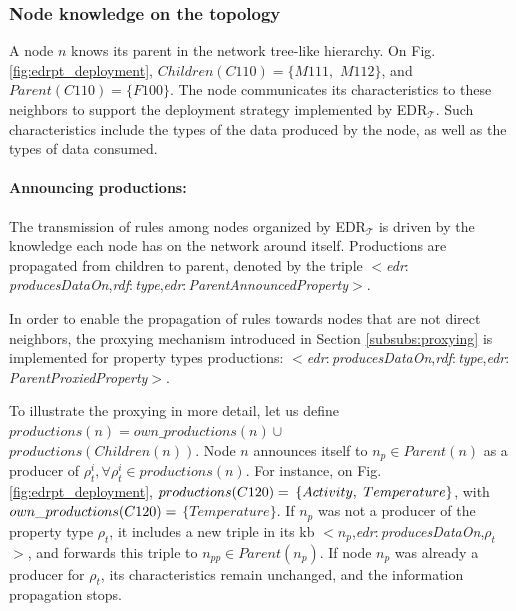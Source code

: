 \documentclass[sw]{iosart2x}
\newcommand{\edrt}{EDR$_{\mathcal{T}}$\xspace}
\newcommand{\namespace}[1]{\textit{#1$:$}}
\newcommand{\concept}[2]{\namespace{#1}\-\textit{#2}}
\newcommand{\triplet}[3]{$<$#1,\textit{#2},#3$>$}
\begin{document}
\subsubsection{Node knowledge on the topology}
\label{subsub:topology}

A node $n$ knows its parent in the network tree-like hierarchy. 
On Fig. \ref{fig:edrpt_deployment}, $Children(C110)=\{M111,$ $ M112\}$, and $Parent(C110)=\{F100\}$.
The node communicates its characteristics to these neighbors to support the deployment strategy implemented by \edrt.
Such characteristics include the types of the data produced by the node, as well as the types of data consumed.

\paragraph{Announcing productions:}
The transmission of rules among nodes organized by \edrt is driven by the knowledge each node has on the network around itself.
Productions are propagated from children to parent, denoted by the triple \triplet{\concept{edr}{produces\-Data\-On}}{\concept{rdf}{type}}{\concept{edr}{Parent\-Announced\-Property}}. 

In order to enable the propagation of rules towards nodes that are not direct neighbors, the proxying mechanism introduced in Section \textsection \ref{subsubs:proxying} is implemented for property types productions: \triplet{\concept{edr}{produces\-Data\-On}}{\concept{rdf}{type}}{\concept{edr}{Parent\-Proxied\-Property}}.

To illustrate the proxying in more detail, let us define $productions(n)=own\_productions(n)\cup$\\$productions(Children(n))$. 
Node $n$ announces itself to $n_{p}\in Parent(n)$ as a producer of $\rho^{i}_t, \forall \rho^{i}_t\in productions(n)$.
For instance, on Fig. \ref{fig:edrpt_deployment}, $pro\-duc\-tions(C120) =$ $\{Ac\-ti\-vi\-ty,$ $Tem\-pe\-ra\-ture\}$, with\\$own\_\-productions(C120) =$ $\{Temperature\}$.
If $n_{p}$ was not a producer of the property type $\rho_t$, it includes a new triple in its \gls{kb} \triplet{$n_{p}$}{\concept{edr}{produces\-Data\-On}}{$\rho_t$}, and forwards this triple to $n_{pp}\in Parent(n_p)$.
If node $n_{p}$ was already a producer for $\rho_t$, its characteristics remain unchanged, and the information propagation stops.
\end{document}
